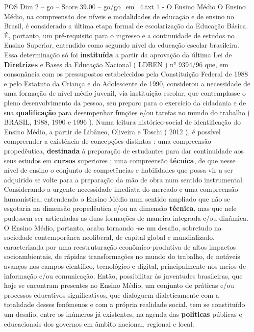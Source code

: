 \begin{textsample}{POS Dim 2 – go – Score 39.00 – go/go\_em\_4.txt}  \label{ex:f2_pos_171}
1 - O Ensino Médio O Ensino Médio, na compreensão dos níveis e modalidades de educação e de ensino no Brasil, é considerado a última etapa formal de escolarização da Educação Básica.
É, portanto, um pré-requisito para o ingresso e a continuidade de estudos no Ensino Superior, entendido como segundo nível da educação escolar brasileira.
Essa determinação só foi \textbf{instituída} a partir da aprovação da última Lei de \textbf{Diretrizes} e Bases da Educação Nacional ( LDBEN ) n{\EmojiFont °} 9394/96 que, em consonância com os pressupostos estabelecidos pela Constituição Federal de 1988 e pelo Estatuto da Criança e do Adolescente de 1990, considerou a necessidade de uma formação de nível médio juvenil, via instituição escolar, que contemplasse o pleno desenvolvimento da pessoa, seu preparo para o exercício da cidadania e de sua \textbf{qualificação} para desempenhar funções e/ou tarefas no mundo do trabalho ( BRASIL, 1988, 1990 e 1996 ).
Numa leitura histórico-social de identificação do Ensino Médio, a partir de Libâneo, Oliveira e Toschi ( 2012 ), é possível compreender a existência de concepções distintas : uma compreensão propedêutica, \textbf{destinada} à preparação de estudantes para dar continuidade aos seus estudos em \textbf{cursos} superiores ; uma compreensão \textbf{técnica}, de que nesse nível de ensino o conjunto de competências e habilidades que possa vir a ser adquirido se volte para a preparação da mão de obra num sentido instrumental.
Considerando a urgente necessidade imediata do mercado e uma compreensão humanística, entendendo o Ensino Médio num sentido ampliado que não se esgotaria na dimensão propedêutica e/ou na dimensão \textbf{técnica}, mas que nele pudessem ser articuladas as duas formações de maneira integrada e/ou dinâmica.
O Ensino Médio, portanto, acaba tornando -se um desafio, sobretudo na sociedade contemporânea neoliberal, de capital global e mundializado, caracterizada por uma reestruturação econômico-produtiva de altos impactos socioambientais, de rápidas transformações no mundo do trabalho, de notáveis avanços nos campos científico, tecnológico e digital, principalmente nos meios de informação e/ou comunicação.
Então, possibilitar às juventudes brasileiras, que hoje se encontram presentes no Ensino Médio, um conjunto de práticas e/ou processos educativos significativos, que dialoguem dialeticamente com a totalidade desses fenômenos e com a própria realidade social, tem se constituído um desafio, entre os inúmeros já existentes, na agenda das \textbf{políticas} públicas e educacionais dos governos em âmbito nacional, regional e local.

\end{textsample}
